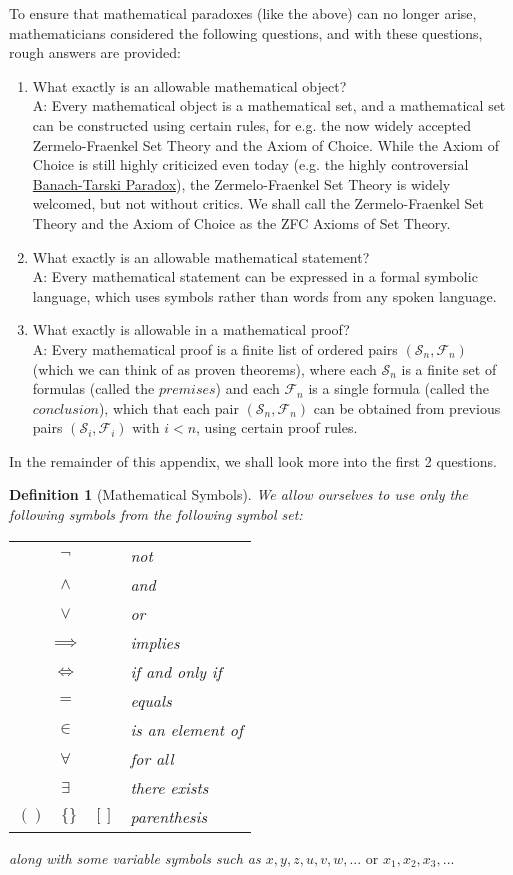 \documentclass[11pt, oneside]{book}
\theoremstyle{break}
\newtheorem{defn}{Definition}[section]
\begin{document}
To ensure that mathematical paradoxes (like the above) can no longer arise, mathematicians considered the following questions, and with these questions, rough answers are provided:
\begin{enumerate}
	\item What exactly is an allowable mathematical object? \\
	A: Every mathematical object is a mathematical set, and a mathematical set can be constructed using certain rules, for e.g. the now widely accepted Zermelo-Fraenkel Set Theory and the Axiom of Choice. While the Axiom of Choice is still highly criticized even today (e.g. the highly controversial \href{https://en.wikipedia.org/wiki/Banach–Tarski_paradox}{Banach-Tarski Paradox}), the Zermelo-Fraenkel Set Theory is widely welcomed, but not without critics. We shall call the Zermelo-Fraenkel Set Theory and the Axiom of Choice as the ZFC Axioms of Set Theory.
	\item What exactly is an allowable mathematical statement? \\
	A: Every mathematical statement can be expressed in a formal symbolic language, which uses symbols rather than words from any spoken language.
	\item What exactly is allowable in a mathematical proof? \\
	A: Every mathematical proof is a finite list of ordered pairs $(\mathscr{S}_n, \mathscr{F}_n)$ (which we can think of as proven theorems), where each $\mathscr{S}_n$ is a finite set of formulas (called the $\textit{premises}$) and each $\mathscr{F}_n$ is a single formula (called the $\textit{conclusion}$), which that each pair $(\mathscr{S}_n, \mathscr{F}_n)$ can be obtained from previous pairs $(\mathscr{S}_i, \mathscr{F}_i)$ with $i < n$, using certain proof rules.
\end{enumerate}

In the remainder of this appendix, we shall look more into the first 2 questions.

\begin{defn}[Mathematical Symbols]
	We allow ourselves to use only the following symbols from the following symbol set: \\
	\begin{center}
		\begin{tabular}{c l}
			$\neg$		&	not \\
			$\land$		&	and \\
			$\lor$		&	or \\
			$\implies$	&	implies \\
			$\iff$	&	if and only if \\
			$=$			&	equals \\
			$\in$		&	is an element of \\
			$\forall$	&	for all \\
			$\exists$	&	there exists \\
			$()\quad\{\}\quad[]$	&	parenthesis
		\end{tabular}
	\end{center}
	along with some variable symbols such as $x, y, z, u, v, w,... \text{ or } x_1, x_2, x_3,...$
\end{defn}
\end{document}
